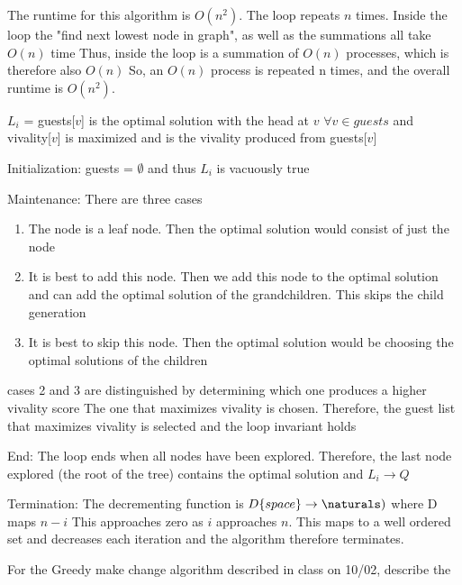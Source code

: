 \documentclass{article}
\begin{document}
 The runtime for this algorithm is $O(n^2)$. The loop repeats $n$ times. Inside the loop
 the "find next lowest node in graph", as well as the summations all take $O(n)$ time
 Thus, inside the loop is a summation of $O(n)$ processes, which is therefore also $O(n)$
 So, an $O(n)$ process is repeated n times, and the overall runtime is $O(n^2)$.

 




 $L_i$ = guests[$v$] is the optimal solution with the head at $v$ $\forall v \in guests$ and vivality[$v$] is maximized and is the vivality produced from guests[$v$]
 

 Initialization: guests = $\emptyset$ and thus $L_i$ is vacuously true

 Maintenance: There are three cases

 \begin{enumerate}[1.]

 \item The node is a leaf node. Then the optimal solution would consist of just the node
 \item It is best to add this node. Then we add this node to the optimal solution
 and can add the optimal solution of the grandchildren. This skips the child generation
 \item It is best to skip this node. Then the optimal solution would be choosing the optimal solutions of the children
 \end{enumerate}

 cases 2 and 3 are distinguished by determining which one produces a higher vivality score
 The one that maximizes vivality is chosen. Therefore, the guest list that maximizes vivality is selected and the loop invariant holds
 

 End: The loop ends when all nodes have been explored. Therefore, the last node explored (the root of the tree) contains the optimal solution and $L_i \rightarrow Q$
 

 Termination: The decrementing function is $D\{space\} \rightarrow \naturals)$ where D maps $n - i$
 This approaches zero as $i$ approaches $n$. This maps to a well ordered set and decreases each iteration
 and the algorithm therefore terminates.





\nextprob

For the Greedy make change algorithm described in class on 10/02, describe the
\end{document}
